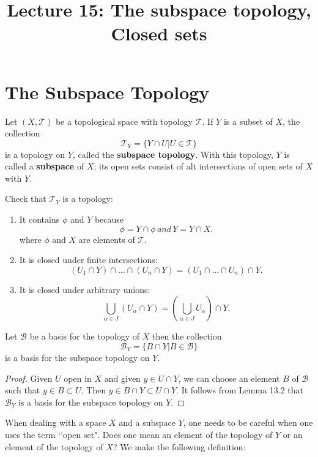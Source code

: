 \documentclass[a4paper,english,12pt]{article}
\title{Lecture 15: The subspace topology, Closed sets}
\author{}
\begin{document}
\maketitle

\section{The Subspace Topology}
\begin{defn}
	Let $(X,\mathcal{T})$ be a topological space with topology $\mathcal{T}$. If $Y$ is a subset of $X$, the collection 
	\[ \mathcal{T}_Y = \{Y \cap U | U \in \mathcal{T}\}	\]
	is a topology on $Y$, called the \textbf{subspace topology}. With this topology, $Y$ is called a \textbf{subspace} of $X$; its open sets consist of alt intersections of open sets of $X$ with $Y$.
\end{defn}
Check that $\mathcal{T}_Y$ is a topology: 
\begin{enumerate}
	\item It contains $\phi$ and $Y$ because 
	\[  \phi = Y \cap \phi \, and \, Y = Y \cap X.\]
	where $\phi$ and $X$ are elements of $\mathcal{T}$.	
	\item It is closed under finite intersections:
	\[ (U_1 \cap Y) \cap ... \cap (U_n \cap Y) = (U_1 \cap ... \cap U_n) \cap Y. \]	
	\item It is closed under arbitrary unions:
	\[ \bigcup_{\alpha \in J} (U_\alpha \cap Y) = (\bigcup_{\alpha \in J}U_\alpha) \cap Y.\]
\end{enumerate}

\begin{lem}
	Let $\mathcal{B}$ be a basis for the topology of $X$ then the collection
	\[ \mathcal{B}_Y = \{B \cap Y | B \in \mathcal{B\}} \]
	is a basis for the subspace topology on $Y$.
\end{lem}

\begin{proof}
	Given $U$ open in $X$ and given $y \in U \cap Y$, we can choose an element $B$ of $\mathcal{B}$ such that $y \in B \subset U$. Then $y \in B \cap Y \subset U \cap Y$. It follows from Lemma 13.2 that $\mathcal{B}_Y$ is a basis for the subspace topology on $Y$.
\end{proof}

When dealing with a space $X$ and a subspace $Y$, one needs to be careful when
one uses the term \lq \lq open set". Does one mean an element of the topology of $Y$ or an element of the topology of $X$? We make the following definition:
\end{document}
